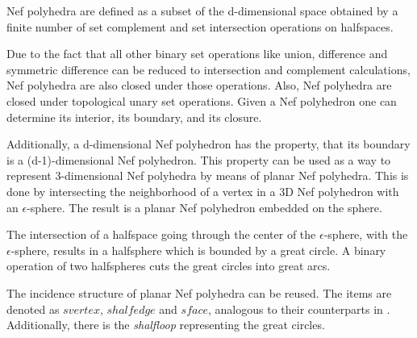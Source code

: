 
\clearpage
{}



Nef polyhedra are defined as a subset of the d-dimensional space obtained by
a finite number of set complement and set intersection operations on
halfspaces. 

Due to the fact that all other binary set operations like union,
difference and symmetric difference can be reduced to intersection and
complement calculations, Nef polyhedra are also closed under those
operations. Also, Nef polyhedra are closed under topological unary 
set operations. Given a Nef polyhedron one can determine its interior, its
boundary, and its closure.

Additionally, a d-dimensional Nef polyhedron has the property, that its boundary
is a (d-1)-dimensional Nef polyhedron. This property can be used as a way to
represent 3-dimensional Nef polyhedra by means of planar Nef polyhedra.
This is done by intersecting the neighborhood of a vertex in a 3D Nef polyhedron
with an $\epsilon$-sphere. The result is a planar Nef polyhedron embedded
on the sphere.

The intersection of a halfspace going through the center of the $\epsilon$-sphere,
with the $\epsilon$-sphere, results in a halfsphere which is bounded by
a great circle. A binary operation of two halfspheres cuts the great circles
into great arcs.

The incidence structure of planar Nef polyhedra can be reused. The items
are denoted as $svertex$, $shalfedge$ and $sface$, analogous 
to their counterparts in . Additionally, there is the
\emph{shalfloop} representing the great circles.

%

